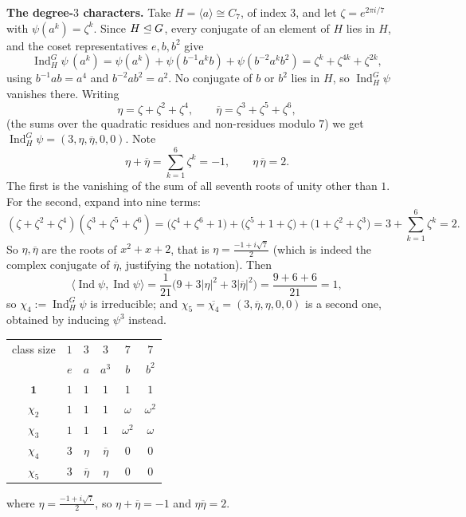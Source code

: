 \documentclass[a4paper]{scrartcl}
\newcommand{\Ind}{\operatorname{Ind}}
\newcommand{\ip}[2]{\langle #1, #2 \rangle}
\newcommand{\gen}[1]{\langle #1 \rangle}
\begin{document}
\textbf{The degree-$3$ characters.} Take $H = \gen a\cong C_7$, of index $3$, and let $\zeta = e^{2\pi i/7}$ with $\psi(a^k) = \zeta^k$. Since $H\trianglelefteq G$, every conjugate of an element of $H$ lies in $H$, and the coset representatives $e, b, b^2$ give
$$\Ind_H^G\psi\,(a^k) = \psi(a^k)+\psi(b^{-1}a^kb) + \psi(b^{-2}a^kb^2) = \zeta^k+\zeta^{4k}+\zeta^{2k},$$
using $b^{-1}ab = a^4$ and $b^{-2}ab^2 = a^2$. No conjugate of $b$ or $b^2$ lies in $H$, so $\Ind_H^G\psi$ vanishes there. Writing
$$\eta = \zeta+\zeta^2+\zeta^4, \qquad \overline\eta = \zeta^3+\zeta^5+\zeta^6,$$
(the sums over the quadratic residues and non-residues modulo $7$) we get $\Ind_H^G\psi = (3,\eta,\overline\eta,0,0)$. Note
$$\eta+\overline\eta = \sum_{k=1}^6\zeta^k = -1, \qquad \eta\,\overline\eta = 2.$$
The first is the vanishing of the sum of all seventh roots of unity other than $1$. For the second, expand into nine terms:
$$(\zeta+\zeta^2+\zeta^4)(\zeta^3+\zeta^5+\zeta^6) = \big(\zeta^4+\zeta^6+1\big)+\big(\zeta^5+1+\zeta\big)+\big(1+\zeta^2+\zeta^3\big) = 3 + \sum_{k=1}^6\zeta^k = 2.$$
So $\eta,\overline\eta$ are the roots of $x^2+x+2$, that is $\eta = \frac{-1+i\sqrt7}{2}$ (which is indeed the complex conjugate of $\overline\eta$, justifying the notation). Then
$$\ip{\Ind\psi}{\Ind\psi} = \frac1{21}\big(9 + 3|\eta|^2+3|\overline\eta|^2\big) = \frac{9+6+6}{21} = 1,$$
so $\chi_4 := \Ind_H^G\psi$ is irreducible; and $\chi_5 = \overline{\chi_4} = (3,\overline\eta,\eta,0,0)$ is a second one, obtained by inducing $\psi^3$ instead.

\begin{center}
\renewcommand{\arraystretch}{1.35}
\setlength{\tabcolsep}{11pt}
\begin{tabular}{c|ccccc}
\toprule
class size & $1$ & $3$ & $3$ & $7$ & $7$\\
 & $e$ & $a$ & $a^3$ & $b$ & $b^2$\\
\midrule
$\mathbf 1$ & $1$ & $1$ & $1$ & $1$ & $1$\\
$\chi_2$ & $1$ & $1$ & $1$ & $\omega$ & $\omega^2$\\
$\chi_3$ & $1$ & $1$ & $1$ & $\omega^2$ & $\omega$\\
$\chi_4$ & $3$ & $\eta$ & $\overline\eta$ & $0$ & $0$\\
$\chi_5$ & $3$ & $\overline\eta$ & $\eta$ & $0$ & $0$\\
\bottomrule
\end{tabular}
\end{center}
where $\eta = \frac{-1+i\sqrt7}{2}$, so $\eta+\overline\eta = -1$ and $\eta\overline\eta = 2$.
\end{document}
